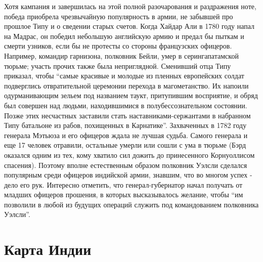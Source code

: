 \documentclass[
  oneside,
  12pt,
  titlepage]{book}
\begin{document}
Хотя кампания и завершилась на этой полной разочарования и раздражения ноте, победа приобрела чрезвычайную популярность в армии, не забывшей про прошлое Типу и о сведении старых счетов. Когда Хайдар Али в 1780 году напал на Мадрас, он победил небольшую английскую армию и предал бы пыткам и смерти узников, если бы не протесты со стороны французских офицеров. Например, командир гарнизона, полковник Бейли, умер в серингапатамской тюрьме; участь прочих также была неприглядной. Сменивший отца Типу приказал, чтобы ``самые красивые и молодые из пленных европейских солдат подверглись отвратительной церемонии перехода в магометанство. Их напоили одурманивающим зельем под названием таукт, притупившим восприятие, и обряд был совершен над людьми, находившимися в полубессознательном состоянии. Позже этих несчастных заставили стать наставниками-сержантами в набранном Типу батальоне из рабов, похищенных в Карнатике''. Захваченных в 1782 году генерала Мэтьюза и его офицеров ждала не лучшая судьба. Самого генерала и еще 17 человек отравили, остальные умерли или сошли с ума в тюрьме (Бэрд оказался одним из тех, кому хватило сил дожить до принесенного Корнуоллисом спасения). Поэтому вполне естественным образом полковник Уэлсли сделался популярным среди офицеров индийской армии, знавшим, что во многом успех - дело его рук. Интересно отметить, что генерал-губернатор начал получать от младших офицеров прошения, в которых высказывалось желание, чтобы ``им позволили в любой из будущих операций служить под командованием полковника Уэлсли''.

\hypertarget{appendix-ux43fux440ux438ux43bux43eux436ux435ux43dux438ux44f}{%
\appendix}


\hypertarget{ux43aux430ux440ux442ux430-ux438ux43dux434ux438ux438}{%
\chapter{Карта Индии}\label{ux43aux430ux440ux442ux430-ux438ux43dux434ux438ux438}}
\end{document}

